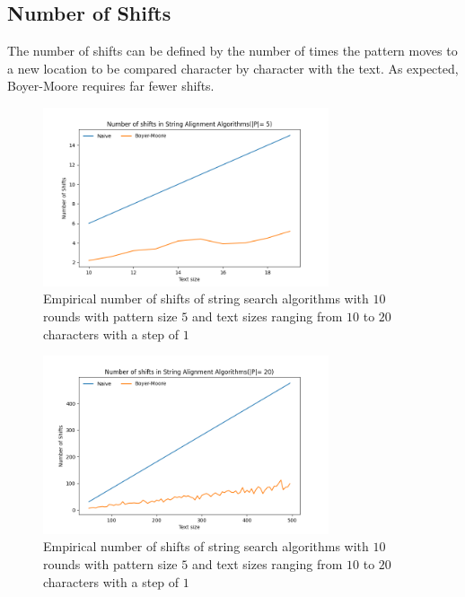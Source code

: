 \documentclass[11pt, letterpaper]{article}
\begin{document}
\subsection{Number of Shifts}
The number of shifts can be defined by the number of times the pattern moves to a new location to be compared character by character with the text. As expected, Boyer-Moore requires far fewer shifts. 

\begin{figure}[H] \centering
    \includegraphics[width=0.75\textwidth]{shifts/r1.png}
    \caption{Empirical number of shifts of string search algorithms with $10$ rounds with pattern size $5$ and text sizes ranging from $10$ to $20$ characters with a step of $1$}
    \label{shiftsr1}
\end{figure}

\begin{figure}[H] \centering
    \includegraphics[width=0.75\textwidth]{shifts/r2.png}
    \caption{Empirical number of shifts of string search algorithms with $10$ rounds with pattern size $5$ and text sizes ranging from $10$ to $20$ characters with a step of $1$}
    \label{shiftsr2}
\end{figure}
\end{document}
